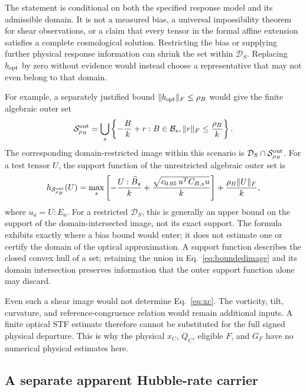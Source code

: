 The statement is conditional on both the specified response model and its admissible domain. It is not a measured bias, a universal impossibility theorem for shear observations, or a claim that every tensor in the formal affine extension satisfies a complete cosmological solution. Restricting the bias or supplying further physical response information can shrink the set within $\mathcal D_S$. Replacing $b_{\rm opt}$ by zero without evidence would instead choose a representative that may not even belong to that domain.

For example, a separately justified bound $\|b_{\rm opt}\|_F\leq\rho_B$ would give the finite algebraic outer set
\begin{equation}
 \mathcal S^{\rm out}_{\rho_B}
 =\bigcup_s\left\{-\frac{B}{k}+r:B\in\mathcal B_s,
                               \|r\|_F\leq\frac{\rho_B}{k}\right\}.
 \label{eq:boundedimage}
\end{equation}
The corresponding domain-restricted image within this scenario is $\mathcal D_S\cap\mathcal S^{\rm out}_{\rho_B}$. For a test tensor $U$, the support function of the unrestricted algebraic outer set is
\begin{equation}
 h_{\mathcal S^{\rm out}_{\rho_B}}(U)
 =\max_s\left[-\frac{U:\widehat B_s}{k}
 +\frac{\sqrt{c_{0.05}\,u^TC_{B,s}u}}{k}\right]
 +\frac{\rho_B\|U\|_F}{k},
 \label{eq:supportimage}
\end{equation}
where $u_a=U:E_a$. For a restricted $\mathcal D_S$, this is generally an upper bound on the support of the domain-intersected image, not its exact support. The formula exhibits exactly where a bias bound would enter; it does not estimate one or certify the domain of the optical approximation. A support function describes the closed convex hull of a set; retaining the union in Eq.~\eqref{eq:boundedimage} and its domain intersection preserves information that the outer support function alone may discard.

Even such a shear image would not determine Eq.~\eqref{eq:xc}. The vorticity, tilt, curvature, and reference-congruence relation would remain additional inputs. A finite optical STF estimate therefore cannot be substituted for the full signed physical departure. This is why the physical $x_C$, $Q_C$, eligible $F$, and $G_F$ have no numerical physical estimates here.

\subsection{A separate apparent Hubble-rate carrier}

